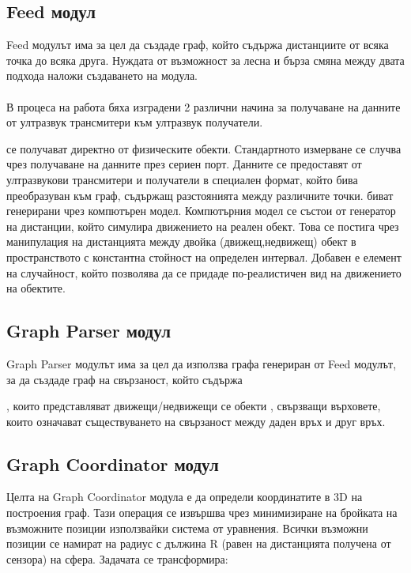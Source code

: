 \subsection{Feed модул}
Feed модулът има за цел да създаде граф, който съдържа дистанциите от всяка точка до всяка друга. Нуждата от възможност за лесна и бърза смяна между двата подхода наложи създаването на модула.\\\\
В процеса на работа бяха изградени 2 различни начина за получаване на данните от ултразвук трансмитери към ултразвук получатели. 
\begin{enumerate}
     се получават директно от физическите обекти. Стандартното измерване се случва чрез получаване на данните през сериен порт. Данните се предоставят от ултразвукови трансмитери и получатели в специален формат, който бива преобразуван към граф, съдържащ разстоянията между различните точки.
     биват генерирани чрез компютърен модел. Компютърния модел се състои от генератор на дистанции, който симулира движението на реален обект. Това се постига чрез манипулация на дистанцията между двойка (движещ,недвижещ) обект в пространството с константна стойност на определен интервал. Добавен е елемент на случайност, който позволява да се придаде по-реалистичен вид на движението на обектите.
\end{enumerate}

\pagebreak

\subsection{Graph Parser модул}
Graph Parser модулът има за цел да използва графа генериран от Feed модулът, за да създаде граф на свързаност, който съдържа
\begin{enumerate}
, които представляват движещи/недвижещи се обекти 
, свързващи върховете, които означават съществуването на свързаност между
даден връх и друг връх.
\end{enumerate}

\pagebreak

\subsection{Graph Coordinator модул}
Целта на Graph Coordinator модула е да определи координатите в 3D на построения граф. Тази операция се извършва чрез минимизиране на бройката на възможните позиции използвайки система от уравнения. Всички възможни позиции се намират на радиус с дължина R (равен на дистанцията получена от сензора) на сфера. Задачата се трансформира:\\

